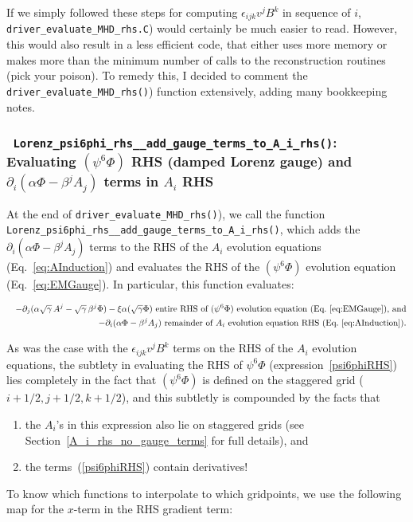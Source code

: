 \documentclass[showpacs,amsmath,amssymb,prd]{revtex4}
\newcommand{\beqn}{\begin{eqnarray}}
\newcommand{\eeqn}{\end{eqnarray}}
\begin{document}
If we simply followed these steps for computing
$\epsilon_{ijk} v^j B^k$ in sequence of $i$, {\tt
  driver\_evaluate\_MHD\_rhs.C}) would certainly be much easier to
read. However, this would also result in a less efficient code, that
either uses more memory or makes more than the minimum number of calls
to the reconstruction routines (pick your poison). To remedy this, I
decided to comment the {\tt driver\_evaluate\_MHD\_rhs()}) function
extensively, adding many bookkeeping notes.

\subsubsection{{\tt
    Lorenz\_psi6phi\_rhs\_\_add\_gauge\_terms\_to\_A\_i\_rhs()}:
  Evaluating $(\psi^6 \Phi)$ RHS (damped Lorenz gauge) and $\partial_i
  (\alpha \Phi -\beta^j A_j)$ terms in $A_i$ RHS}


\begin{center}
\end{center}
At the end of {\tt driver\_evaluate\_MHD\_rhs()}), we call the
function {\tt Lorenz\_psi6phi\_rhs\_\_add\_gauge\_terms\_to\_A\_i\_rhs()}, which
adds the $\partial_i (\alpha \Phi -\beta^j A_j)$ terms to the RHS of
the $A_i$ evolution equations (Eq.~\ref{eq:AInduction}) and evaluates
the RHS of the $(\psi^6 \Phi)$ evolution equation
(Eq.~\ref{eq:EMGauge}). In particular, this function evaluates:

\beqn
&& - \partial_j (\alpha \sqrt{\gamma}\, A^j - \sqrt{\gamma}\, \beta^j \Phi)
- \xi \alpha (\sqrt{\gamma} \Phi) \text{ entire RHS of $(\psi^6 \Phi)$
evolution equation (Eq.~\ref{eq:EMGauge}), and} 
\label{psi6phiRHS}
 \\
&& - \partial_i (\alpha \Phi -\beta^j A_j) \text{ remainder of $A_i$
  evolution equation RHS (Eq.~\ref{eq:AInduction}).}
\label{AiRHS_gauge_terms}
\eeqn

As was the case with the $\epsilon_{ijk} v^j B^k$ terms on the RHS of
the $A_i$ evolution equations, the subtlety in evaluating the RHS of
$\psi^6 \Phi$ (expression~\ref{psi6phiRHS}) lies completely in the
fact that $(\psi^6\Phi)$ is defined on the staggered grid
($i+1/2,j+1/2,k+1/2$), and this subtletly is compounded by the facts
that 
\begin{enumerate}
\item the $A_i$'s in this expression also lie on staggered grids (see
Section~\ref{A_i_rhs_no_gauge_terms} for full details), and 
\item the terms~(\ref{psi6phiRHS}) contain derivatives! 
\end{enumerate}
To know which functions to interpolate to which
gridpoints, we use the following map for the $x$-term in the RHS
gradient term:
\end{document}
